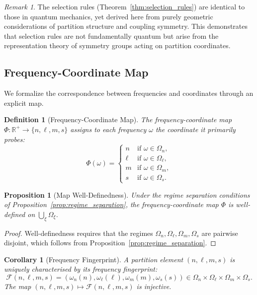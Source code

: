 \documentclass[twocolumn,10pt,a4paper]{article}
\newtheorem{corollary}[theorem]{Corollary}
\newtheorem{proposition}[theorem]{Proposition}
\newtheorem{definition}[theorem]{Definition}
\theoremstyle{remark}
\newtheorem{remark}[theorem]{Remark}
\newcommand{\Reals}{\mathbb{R}}
\begin{document}
\begin{remark}
The selection rules (Theorem~\ref{thm:selection_rules}) are identical to those in quantum mechanics, yet derived here from purely geometric considerations of partition structure and coupling symmetry. This demonstrates that selection rules are not fundamentally quantum but arise from the representation theory of symmetry groups acting on partition coordinates.
\end{remark}

\subsection{Frequency-Coordinate Map}

We formalize the correspondence between frequencies and coordinates through an explicit map.

\begin{definition}[Frequency-Coordinate Map]
\label{def:freq_coord_map}
The \emph{frequency-coordinate map} $\Phi: \Reals^+ \to \{n, \ell, m, s\}$ assigns to each frequency $\omega$ the coordinate it primarily probes:
\begin{equation}
\Phi(\omega) = \begin{cases}
n & \text{if } \omega \in \Omega_n, \\
\ell & \text{if } \omega \in \Omega_\ell, \\
m & \text{if } \omega \in \Omega_m, \\
s & \text{if } \omega \in \Omega_s.
\end{cases}
\end{equation}
\end{definition}

\begin{proposition}[Map Well-Definedness]
\label{prop:map_welldefined}
Under the regime separation conditions of Proposition~\ref{prop:regime_separation}, the frequency-coordinate map $\Phi$ is well-defined on $\bigcup_{\xi} \Omega_\xi$.
\end{proposition}

\begin{proof}
Well-definedness requires that the regimes $\Omega_n, \Omega_\ell, \Omega_m, \Omega_s$ are pairwise disjoint, which follows from Proposition~\ref{prop:regime_separation}.
\end{proof}

\begin{corollary}[Frequency Fingerprint]
\label{cor:frequency_fingerprint}
A partition element $(n, \ell, m, s)$ is uniquely characterised by its \emph{frequency fingerprint}:
\begin{equation}
\mathcal{F}(n, \ell, m, s) = \left(\omega_n(n), \omega_\ell(\ell), \omega_m(m), \omega_s(s)\right) \in \Omega_n \times \Omega_\ell \times \Omega_m \times \Omega_s.
\end{equation}
The map $(n, \ell, m, s) \mapsto \mathcal{F}(n, \ell, m, s)$ is injective.
\end{corollary}
\end{document}
